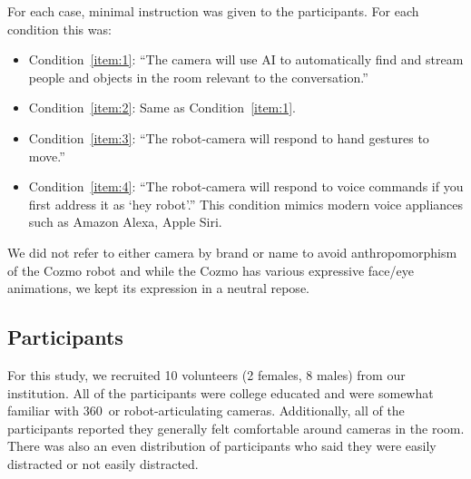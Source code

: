 \documentclass{tufte-handout}
\begin{document}
For each case, minimal instruction was given to the participants. For
each condition this was:
\begin{itemize}
\item Condition~\ref{item:1}: ``The camera will use
  AI to automatically find and stream people and objects in the room
  relevant to the conversation.''
\item Condition~\ref{item:2}: Same as Condition~\ref{item:1}.
\item Condition~\ref{item:3}: ``The robot-camera will respond to hand
  gestures to move.''
\item Condition~\ref{item:4}: ``The robot-camera will respond to voice
  commands if you first address it as `hey robot'.''  This condition
  mimics modern voice appliances such as Amazon Alexa, Apple Siri.
\end{itemize}
We did not refer to either camera by brand or name to avoid
anthropomorphism of the Cozmo robot and while the Cozmo has various
expressive face/eye animations, we kept its expression in a neutral
repose.

\subsection{Participants}
For this study, we recruited 10 volunteers (2 females, 8 males) from
our institution.  All of the participants were college educated and
were somewhat familiar with 360\textdegree\ or robot-articulating
cameras.  Additionally, all of the participants reported they
generally felt comfortable around cameras in the room.  There was also
an even distribution of participants who said they were easily
distracted or not easily distracted.
\end{document}
